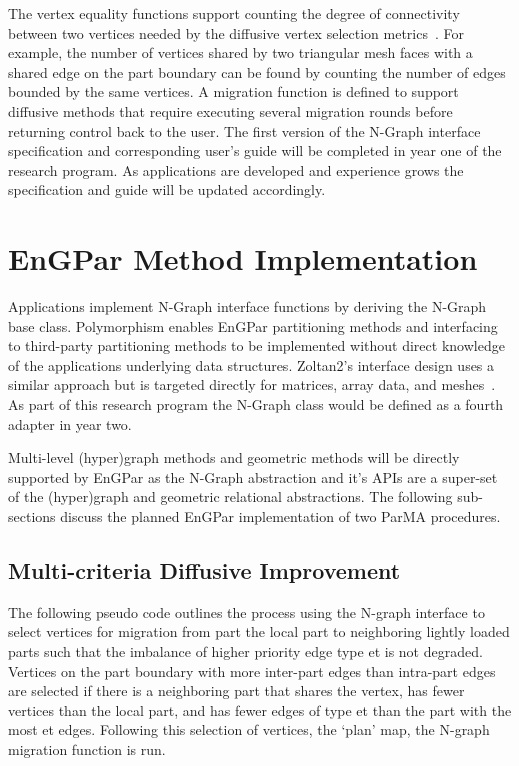 \documentclass[12pt]{article}
\begin{document}
The vertex equality functions support counting the degree of connectivity
between two vertices needed by the diffusive vertex selection
metrics~\cite{Fiduccia1982,Kernighan1970}.
For example, the number of vertices shared by two triangular mesh faces with a
shared edge on the part boundary can be found by counting the number of edges
bounded by the same vertices.
A migration function is defined to support diffusive methods that require
executing several migration rounds before returning control back to the user.
The first version of the N-Graph interface specification and corresponding
user’s guide will be completed in year one of the research program.
As applications are developed and experience grows the specification and guide
will be updated accordingly.

\section{EnGPar Method Implementation} \label{sec:methods}

Applications implement N-Graph interface functions by deriving the N-Graph base
class.
Polymorphism enables EnGPar partitioning methods and interfacing to third-party
partitioning methods to be implemented without direct knowledge of the
applications underlying data structures.
Zoltan2’s interface design uses a similar approach but is targeted directly for
matrices, array data, and meshes~\cite{zoltan2}.
As part of this research program the N-Graph class would be defined as a fourth
adapter in year two.

Multi-level (hyper)graph methods and geometric methods will be directly
supported by EnGPar as the N-Graph abstraction and it’s APIs are a super-set of
the (hyper)graph and geometric relational abstractions.
The following sub-sections discuss the planned EnGPar implementation of two
ParMA procedures.

\subsection{Multi-criteria Diffusive Improvement} \label{sec:diffusion}

The following pseudo code outlines the process using the N-graph interface to
select vertices for migration from part the local part to neighboring lightly
loaded parts such that the imbalance of higher priority edge type et is not
degraded.
Vertices on the part boundary with more inter-part edges than intra-part edges
are selected if there is a neighboring part that shares the vertex, has fewer
vertices than the local part, and has fewer edges of type et than the part with
the most et edges.
Following this selection of vertices, the ‘plan’ map, the N-graph migration
function is run.
\end{document}
